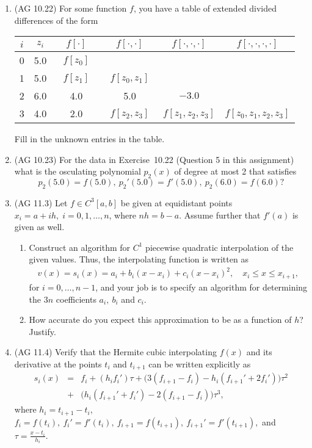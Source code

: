 \documentclass[11pt]{article}
\begin{document}
\begin{enumerate}
\item (AG 10.22) For some function $f$, you have a table of extended divided
  differences of the form
  \begin{center}
    \begin{tabular}[h]{c|c|cccc} 
$i$ & $z_i$ & ${\quad}f[\cdot]{\quad}$ & ${\quad}f[\cdot,\cdot]{\quad}$ &
$f[\cdot,\cdot,\cdot]$ &
$f[\cdot, \cdot, \cdot, \cdot]$ \\ \hline
0 & 5.0   & $f[z_0]$ & & & \\ 
1 & 5.0   & $f[z_1]$ & $f[z_0,z_1]$ & & \\ 
2 & 6.0 & 4.0 & 5.0 & $-3.0$ & \\ 
3 & 4.0 & 2.0 &$ f[z_2,z_3]$ & $f[z_1,z_2,z_3]$ & $f[z_0,z_1,z_2,z_3]$  \\
    \end{tabular}
  \end{center}
  Fill in the unknown entries in the table. 

\item (AG 10.23)  For the data in Exercise~10.22 (Question 5 in this assignment)
 what is the osculating polynomial $p_2(x)$ of degree
     at most 2 that satisfies
     \[ p_2(5.0)=f(5.0),\ p_2'(5.0)=f'(5.0),\   p_2(6.0)=f(6.0) ? \]


\item (AG 11.3) Let $f \in C^3[a,b]$ be given at equidistant points $x_i = a + ih, \; i = 0, 1, \ldots , n$,
where $nh = b-a$. Assume further that $f'(a)$ is given as well.
\begin{enumerate}
\item Construct an algorithm for $C^1$ piecewise quadratic interpolation of the given values.
Thus, the interpolating function is written as
\begin{eqnarray*} 
v(x) = s_i (x) =  a_i + b_i (x-x_i) + c_i (x-x_i)^2, \quad x_i \leq x \leq x_{i+1},
\end{eqnarray*}
for $i=0, \ldots , n-1$,
and your job is to specify an algorithm for determining the $3n$
coefficients $a_i, \ b_i$ and $c_i$.
\item
How accurate do you expect this approximation to be as a function of $h$? Justify.
\end{enumerate}

\item (AG 11.4)
Verify that the Hermite cubic interpolating $f(x)$ and its derivative
at the points $t_i$ and $t_{i+1}$ can be written explicitly as
\begin{eqnarray*}
s_i(x) &=& f_i + \left( h_if_i' \right)\tau + \Big( 3(f_{i+1}-f_i) - h_i(f_{i+1}'+2f_i') \Big)\tau^2\\
&+& \Big( h_i(f_{i+1}'+f_i') - 2(f_{i+1} - f_i) \Big) \tau^3,
\end{eqnarray*}
where $h_i = t_{i+1}-t_i$, $f_i=f(t_i),~f_i' = f'(t_i),~
f_{i+1}=f(t_{i+1}),~f_{i+1}' = f'(t_{i+1}),$ and
$\tau = \frac{x-t_i}{h_i}$.



\end{enumerate}
\end{document}
